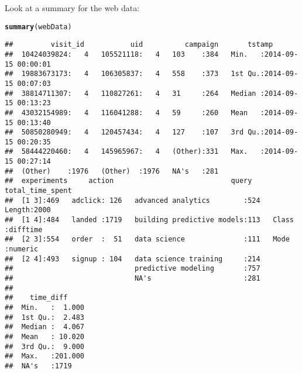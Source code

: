 \documentclass{article}\usepackage[]{graphicx}\usepackage[]{color}
\makeatletter
\newcommand{\hlstd}[1]{\textcolor[rgb]{0.345,0.345,0.345}{#1}}%
\newcommand{\hlkwd}[1]{\textcolor[rgb]{0.737,0.353,0.396}{\textbf{#1}}}%
\newenvironment{kframe}{%
 \def\at@end@of@kframe{}%
 \ifinner\ifhmode%
  \def\at@end@of@kframe{\end{minipage}}%
  \begin{minipage}{\columnwidth}%
 \fi\fi%
 \def\FrameCommand##1{\hskip\@totalleftmargin \hskip-\fboxsep
 \colorbox{shadecolor}{##1}\hskip-\fboxsep
     \hskip-\linewidth \hskip-\@totalleftmargin \hskip\columnwidth}%
 \MakeFramed {\advance\hsize-\width
   \@totalleftmargin\z@ \linewidth\hsize
   \@setminipage}}%
 {\par\unskip\endMakeFramed%
 \at@end@of@kframe}
\newenvironment{knitrout}{}{} %
\makeatother
\begin{document}
Look at a summary for the web data:
\begin{knitrout}
\color{fgcolor}\begin{kframe}
\begin{alltt}
\hlkwd{summary}\hlstd{(webData)}
\end{alltt}
\begin{verbatim}
##         visit_id           uid          campaign       tstamp                   
##  10424039824:   4   105521118:   4   103    :384   Min.   :2014-09-15 00:00:01  
##  19883673173:   4   106305837:   4   558    :373   1st Qu.:2014-09-15 00:07:03  
##  38814711307:   4   110827261:   4   31     :264   Median :2014-09-15 00:13:23  
##  43032154989:   4   116041288:   4   59     :260   Mean   :2014-09-15 00:13:40  
##  50850280949:   4   120457434:   4   127    :107   3rd Qu.:2014-09-15 00:20:35  
##  58444220460:   4   145965967:   4   (Other):331   Max.   :2014-09-15 00:27:14  
##  (Other)    :1976   (Other)  :1976   NA's   :281                                
##  experiments     action                            query     total_time_spent 
##  [1 3]:469   adclick: 126   advanced analytics        :524   Length:2000      
##  [1 4]:484   landed :1719   building predictive models:113   Class :difftime  
##  [2 3]:554   order  :  51   data science              :111   Mode  :numeric   
##  [2 4]:493   signup : 104   data science training     :214                    
##                             predictive modeling       :757                    
##                             NA's                      :281                    
##                                                                               
##    time_diff      
##  Min.   :  1.000  
##  1st Qu.:  2.483  
##  Median :  4.067  
##  Mean   : 10.020  
##  3rd Qu.:  9.000  
##  Max.   :201.000  
##  NA's   :1719
\end{verbatim}
\end{kframe}
\end{knitrout}
\end{document}
